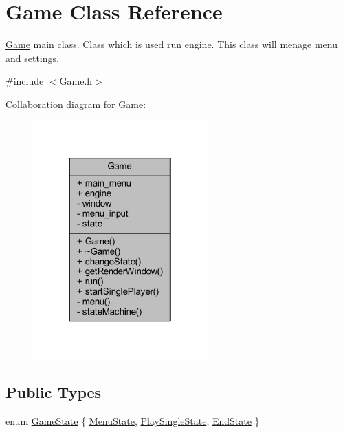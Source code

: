 \hypertarget{class_game}{}\section{Game Class Reference}
\label{class_game}


\hyperlink{class_game}{Game} main class. Class which is used run engine. This class will menage menu and settings.  




{\ttfamily \#include $<$Game.\+h$>$}



Collaboration diagram for Game\+:\nopagebreak
\begin{figure}[H]
\begin{center}
\leavevmode
\includegraphics[width=190pt]{class_game__coll__graph}
\end{center}
\end{figure}
\subsection*{Public Types}
\begin{DoxyCompactItemize}
\item 
enum \hyperlink{class_game_a7f57a7a8408e554d0a72882c287e1d04}{Game\+State} \{ \hyperlink{class_game_a7f57a7a8408e554d0a72882c287e1d04a7a51f25e2194782f14973800a89e58fd}{Menu\+State}, 
\hyperlink{class_game_a7f57a7a8408e554d0a72882c287e1d04a08c295bf12e492bf9d64b14d8d83b736}{Play\+Single\+State}, 
\hyperlink{class_game_a7f57a7a8408e554d0a72882c287e1d04afc92d30e44f9ec0ff71b695a3ec6d5ca}{End\+State}
 \}
\end{DoxyCompactItemize}
